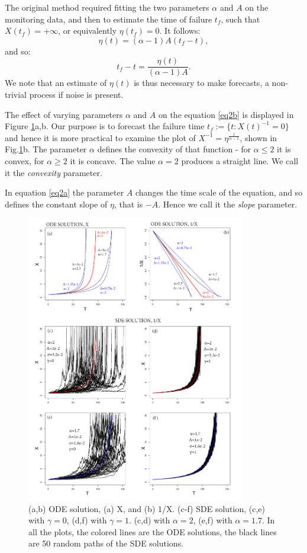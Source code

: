 \documentclass{article}
\begin{document}
The original method required fitting the two parameters $\alpha$ and $A$ on the monitoring data, and then to estimate the time of failure $t_f$, such that $X(t_f) =+\infty$, or equivalently $\eta(t_f)=0$. It follows:
$$\eta(t)=(\alpha-1)A(t_f-t),$$
and so:
$$t_f-t=\frac{\eta(t)}{(\alpha-1)A}.$$
We note that an estimate of $\eta(t)$ is thus necessary to make forecasts, a non-trivial process if noise is present.

The effect of varying parameters $\alpha$ and $A$ on the equation \ref{eq2b} is displayed in Figure \ref{Fig1}a,b. Our purpose is to forecast the failure time $t_f:=\{t:X(t)^{-1}=0\}$ and hence it is more practical to examine the plot of $X^{-1}=\eta^{\frac{1}{\alpha-1}}$, shown in Fig.\ref{Fig1}b. The parameter $\alpha$ defines the convexity of that function - for $\alpha\le2$ it is convex, for $\alpha\ge2$ it is concave. The value $\alpha=2$ produces a straight line. We call it the {\it convexity} parameter.

In equation \ref{eq2a} the parameter $A$ changes the time scale of the equation, and so defines the constant slope of $\eta$, that is $-A$. Hence we call it the {\it slope} parameter.

\begin{figure}[H]
\centering
\includegraphics[width=0.85\textwidth]{Fig1_plus.png}
\caption{(a,b) ODE solution, (a) X, and (b) 1/X. (c-f) SDE solution, (c,e) with $\gamma=0$, (d,f) with $\gamma=1$. (c,d) with $\alpha=2$, (e,f) with $\alpha=1.7$. In all the plots, the colored lines are the ODE solutions, the black lines are 50 random paths of the SDE solutions.}
\label{Fig1}
\end{figure}
\end{document}
